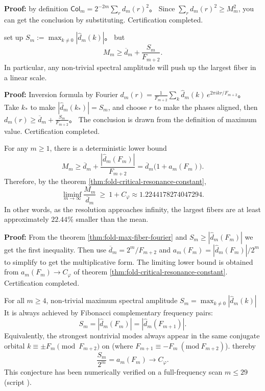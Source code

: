 \textbf{Proof:}
by definition
\(
\mathsf{Col}_m=2^{-2m}\sum_r d_m(r)^2
\)。
Since $\sum_r d_m(r)^2\ge M_m^2$, you can get the conclusion by substituting. Certification completed.

\begin{theorem}
\label{thm:fold-max-fiber-fourier}
set up
\(
S_m:=\max_{k\ne 0}|\widehat d_m(k)|
\)。
but
\[
M_m\ge \overline d_m+\frac{S_m}{F_{m+2}}.
\]
In particular, any non-trivial spectral amplitude will push up the largest fiber in a linear scale.
\end{theorem}

\textbf{Proof:}
Inversion formula by Fourier
\(
d_m(r)=\frac{1}{F_{m+2}}\sum_k \widehat d_m(k)\,e^{2\pi i kr/F_{m+2}}
\)。
Take $k_*$ to make $|\widehat d_m(k_*)|=S_m$, and choose $r$ to make the phases aligned, then
\(
d_m(r)\ge \overline d_m+\frac{S_m}{F_{m+2}}
\)。
The conclusion is drawn from the definition of maximum value. Certification completed.

\begin{corollary}\label{cor:fold-max-fiber-constant-bias}
For any \(m\ge 1\), there is a deterministic lower bound
\[
M_m\ge \overline d_m+\frac{|\widehat d_m(F_m)|}{F_{m+2}}
=\overline d_m\bigl(1+a_m(F_m)\bigr).
\]
Therefore, by the theorem \ref{thm:fold-critical-resonance-constant},
\[
\liminf_{m\to\infty}\frac{M_m}{\overline d_m}\ \ge\ 1+C_\varphi
\approx 1.2244178274047294.
\]
In other words, as the resolution approaches infinity, the largest fibers are at least approximately \(22.44\%\) smaller than the mean.
\end{corollary}

\textbf{Proof:}
From the theorem \ref{thm:fold-max-fiber-fourier} and \(S_m\ge |\widehat d_m(F_m)|\) we get the first inequality.
Then use \(\overline d_m=2^m/F_{m+2}\) and \(a_m(F_m)=|\widehat d_m(F_m)|/2^m\) to simplify to get the multiplicative form.
The limiting lower bound is obtained from \(a_m(F_m)\to C_\varphi\) of theorem \ref{thm:fold-critical-resonance-constant}. Certification completed.

\begin{conjecture}\label{conj:fold-fourier-fibonacci-extremizer}
For all \(m\ge 4\), non-trivial maximum spectral amplitude
\(
S_m=\max_{k\ne 0}|\widehat d_m(k)|
\)
It is always achieved by Fibonacci complementary frequency pairs:
\[
S_m=|\widehat d_m(F_m)|=|\widehat d_m(F_{m+1})|.
\]
Equivalently, the strongest nontrivial modes always appear in the same conjugate orbital
\(
k\equiv\pm F_m\pmod{F_{m+2}}
\)
on (where \(F_{m+1}\equiv -F_m\ (\mathrm{mod}\ F_{m+2})\)).
thereby
\[
\frac{S_m}{2^m}=a_m(F_m)\longrightarrow C_\varphi.
\]
This conjecture has been numerically verified on a full-frequency scan \(m\le 29\) (script ).
\end{conjecture}

